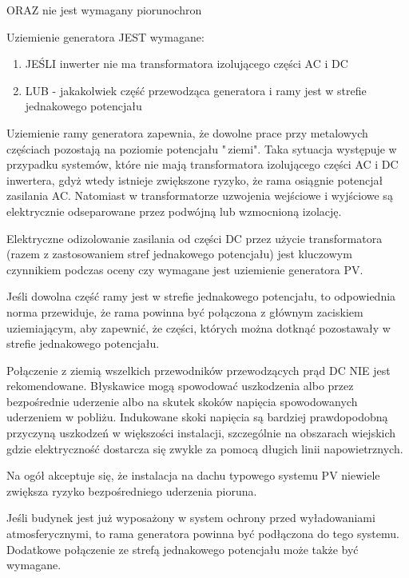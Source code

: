\documentclass[12pt,a4paper]{article}
\begin{document}
ORAZ nie jest wymagany piorunochron 

 

Uziemienie generatora JEST wymagane: 

\begin{enumerate}
\item JEŚLI inwerter nie ma transformatora izolującego części AC i DC 
\item LUB - jakakolwiek część przewodząca generatora i ramy jest w 
strefie jednakowego potencjału 
\end{enumerate}
 

Uziemienie ramy generatora zapewnia, że dowolne prace przy metalowych 
częściach pozostają na poziomie potencjału "\,ziemi". Taka sytuacja 
występuje w przypadku systemów, które nie mają transformatora 
izolującego części AC i DC inwertera, gdyż wtedy istnieje zwiększone 
ryzyko, że rama osiągnie potencjał zasilania AC. Natomiast w 
transformatorze uzwojenia wejściowe i wyjściowe są elektrycznie 
odseparowane przez podwójną lub wzmocnioną izolację. 

 

Elektryczne odizolowanie zasilania od części DC przez użycie 
transformatora (razem z zastosowaniem stref jednakowego potencjału) jest 
kluczowym czynnikiem podczas oceny czy wymagane jest uziemienie 
generatora PV. 

 

Jeśli dowolna część ramy jest w strefie jednakowego potencjału, to 
odpowiednia norma przewiduje, że rama powinna być połączona z głównym 
zaciskiem uziemiającym, aby zapewnić, że części, których można dotknąć 
pozostawały w strefie jednakowego potencjału. 

 

Połączenie z ziemią wszelkich przewodników przewodzących prąd DC NIE 
jest rekomendowane. Błyskawice mogą spowodować uszkodzenia albo przez 
bezpośrednie uderzenie albo na skutek skoków napięcia spowodowanych 
uderzeniem w pobliżu. Indukowane skoki napięcia są bardziej prawdopodobną przyczyną uszkodzeń w większości instalacji, szczególnie 
na obszarach wiejskich gdzie elektryczność dostarcza się zwykle za 
pomocą długich linii napowietrznych. 

 

Na ogół akceptuje się, że instalacja na dachu typowego systemu PV 
niewiele zwiększa ryzyko bezpośredniego uderzenia pioruna. 

 

Jeśli budynek jest już wyposażony w system ochrony przed wyładowaniami 
atmosferycznymi, to rama generatora powinna być podłączona do tego 
systemu. Dodatkowe połączenie ze strefą jednakowego potencjału może 
także być wymagane. 
\end{document}
